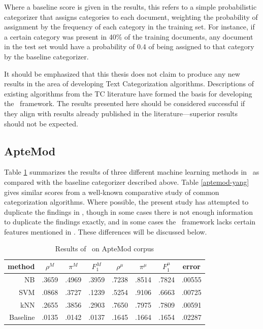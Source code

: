 Where a baseline score is given in the results, this refers to a
simple probabilistic categorizer that assigns categories to each
document, weighting the probability of assignment by the frequency of
each category in the training set.  For instance, if a certain
category was present in 40\% of the training documents, any document
in the test set would have a probability of 0.4 of being assigned to
that category by the baseline categorizer.  

It should be emphasized that this thesis does not claim to produce any
new results in the area of developing Text Categorization algorithms.
Descriptions of existing algorithms from the TC literature have formed
the basis for developing the \aicat\ framework.  The results presented
here should be considered successful if they align with results
already published in the literature---superior results should not be
expected.

\subsection{ApteMod}

Table \ref{aptemod-results} summarizes the results of three different
machine learning methods in \aicat\ as compared with the baseline
categorizer described above.  Table \ref{aptemod-yang} gives similar
scores from a well-known comparative study of common categorization
algorithms. \cite{yang:99} Where possible, the present study has
attempted to duplicate the findings in \cite{yang:99}, though in some
cases there is not enough information to duplicate the findings
exactly, and in some cases the \aicat\ framework lacks certain
features mentioned in \cite{yang:99}.  These differences will be
discussed below.

\begin{table}
\begin{center}
\begin{tabular}{|r c c c c c c c|}
\hline
method    & $\rho^M$ & $\pi^M$ & $F_1^M$ & $\rho^\mu$ & $\pi^\mu$ & $F_1^\mu$ &   error \\
\hline
NB        &   .3659  &  .4969  &  .3959  &  .7238     &  .8514    &  .7824    &  .00555 \\
SVM       &   .0868  &  .3727  &  .1239  &  .5254     &  .9106    &  .6663    &  .00725 \\
kNN       &   .2655  &  .3856  &  .2903  &  .7650     &  .7975    &  .7809    &  .00591 \\
Baseline  &   .0135  &  .0142  &  .0137  &  .1645     &  .1664    &  .1654    &  .02287 \\
\hline
\end{tabular}
\end{center}
\caption{Results of \aicat\ on ApteMod corpus}
\label{aptemod-results}
\end{table}

